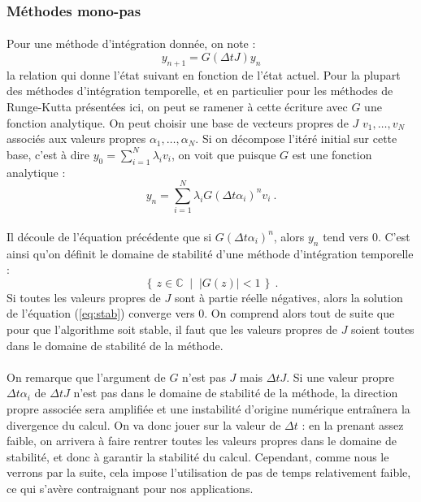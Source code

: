     \subsubsection{Méthodes mono-pas}

      \paragraph{}
      Pour une méthode d'intégration donnée, on note :
      \begin{equation}\label{eq:stab_req}
        y_{n+1} = G\left(\Delta tJ\right)y_n
      \end{equation}
      la relation qui donne l'état suivant en fonction de l'état actuel.
      Pour la plupart des méthodes d'intégration temporelle, et en particulier pour les méthodes de Runge-Kutta présentées ici, on peut se ramener à cette écriture avec $G$ une fonction analytique.
      On peut choisir une base de vecteurs propres de $J$ $v_1, \dots, v_N$ associés aux valeurs propres $\alpha_1, \dots, \alpha_N$.
      Si on décompose l'itéré initial sur cette base, c'est à dire $y_0 = \sum_{i=1}^N\lambda_iv_i$, on voit que puisque $G$ est une fonction analytique :
      \[y_n = \sum_{i=1}^N\lambda_iG\left(\Delta t\alpha_i\right)^nv_i\ .\]

      \paragraph{}
      Il découle de l'équation précédente que si $G\left(\Delta t\alpha_i\right)^n$, alors $y_n$ tend vers 0.
      C'est ainsi qu'on définit le domaine de stabilité d'une méthode d'intégration temporelle :
      \[\left\{\,z\in\mathbb{C}\;\mid\;\left|G\left(z\right)\right| < 1\,\right\}\ .\]
      Si toutes les valeurs propres de $J$ sont à partie réelle négatives, alors la solution de l'équation (\ref{eq:stab}) converge vers 0.
      On comprend alors tout de suite que pour que l'algorithme soit stable, il faut que les valeurs propres de $J$ soient toutes dans le domaine de stabilité de la méthode.

      \paragraph{}
      On remarque que l'argument de $G$ n'est pas $J$ mais $\Delta tJ$.
      Si une valeur propre $\Delta t\alpha_i$ de $\Delta tJ$ n'est pas dans le domaine de stabilité de la méthode, la direction propre associée sera amplifiée et une instabilité d'origine numérique entraînera la divergence du calcul.
      On va donc jouer sur la valeur de $\Delta t$ : en la prenant assez faible, on arrivera à faire rentrer toutes les valeurs propres dans le domaine de stabilité, et donc à garantir la stabilité du calcul.
      Cependant, comme nous le verrons par la suite, cela impose l'utilisation de pas de temps relativement faible, ce qui s'avère contraignant pour nos applications.

